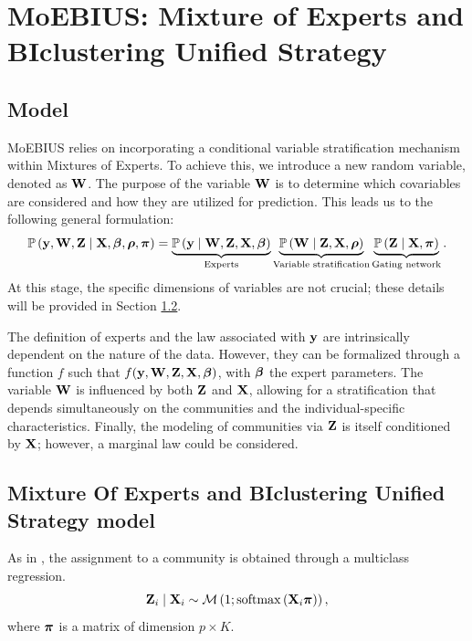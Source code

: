 \section{MoEBIUS: Mixture of Experts and BIclustering Unified Strategy}




\subsection{Model}
MoEBIUS relies on incorporating a conditional variable stratification mechanism within Mixtures of Experts. To achieve this, we introduce a new random variable, denoted as $\mathbf{W}$.
The purpose of the variable $\mathbf{W}$ is to determine which covariables are considered and how they are utilized for prediction. This leads us to the following general formulation:
%
\begin{equation}
    \operatorname{\mathbb{P}}\left(\mathbf{y}, \mathbf{W}, \mathbf{Z} \mid \mathbf{X}, \boldsymbol{\beta}, \boldsymbol{\rho}, \boldsymbol{\pi}\right) = \underbrace{\operatorname{\mathbb{P}}\left(\mathbf{y} \mid  \mathbf{W}, \mathbf{Z},\mathbf{X}, \boldsymbol{\beta}\right)}_{\text{Experts}} 
    \underbrace{\operatorname{\mathbb{P}}\left( \mathbf{W} \mid \mathbf{Z}, \mathbf{X}, \boldsymbol{\rho}\right) }_{\text{Variable stratification}} 
    \underbrace{\operatorname{\mathbb{P}}\left( \mathbf{Z} \mid \mathbf{X},\boldsymbol{\pi}\right)}_{\text{Gating network}}.
\end{equation}
At this stage, the specific dimensions of variables are not crucial; these details will be provided in Section \ref{sec: MoEBIUS_Model}.

The definition of experts and the law associated with \( \mathbf{y} \) are intrinsically dependent on the nature of the data. However, they can be formalized through a function \( f \) such that \( f(\mathbf{y}, \mathbf{W}, \mathbf{Z}, \mathbf{X}, \boldsymbol{\beta}) \), with $\boldsymbol{\beta}$  the expert parameters.
The variable \( \mathbf{W} \) is influenced by both \( \mathbf{Z} \) and \( \mathbf{X} \), allowing for a stratification that depends simultaneously on the communities and the individual-specific characteristics. Finally, the modeling of communities via \( \mathbf{Z} \) is itself conditioned by \( \mathbf{X} \); however, a marginal law could be considered.

\subsection{Mixture Of Experts and BIclustering Unified Strategy model}
\label{sec: MoEBIUS_Model}
As in \cite{courbariaux2022sparse}, the assignment to a community is obtained through a multiclass regression.
\begin{equation}
\label{eq: moebius_Z_eq}
    \mathbf{Z}_{i} \mid \mathbf{X}_i \sim \operatorname{\mathcal{M}}\left(1; \operatorname{softmax}\left(\mathbf{X}_i \boldsymbol{\pi} \right) \right),
\end{equation}
where $\boldsymbol{\pi}$ is a matrix of dimension $p \times K$. 

